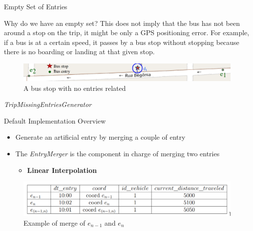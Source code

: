 \documentclass[xcolor=dvipsnames,table]{beamer}
\begin{document}
\begin{frame}{Empty Set of Entries}
        \begin{block}{Why do we have an empty set?}
                This does not imply that the bus has not been around a stop on the trip, 
                it might be only a GPS positioning error. For example, if a bus is at a
                certain speed, it passes by a bus stop without stopping because there
                is no boarding or landing at that given stop.
        \end{block}
        \begin{figure}[h]
                \centering
                \caption{A bus stop with no entries related}
                \includegraphics[width=\textwidth]{images/9202_empty_set.png}
        \end{figure}
\end{frame}
\begin{frame}{\textit{TripMissingEntriesGenerator}}
        \begin{block}{Default Implementation Overview}
                \begin{itemize}
                        \item Generate an artificial entry by merging a couple of entry
                        \item The \textit{EntryMerger} is the component
                                in charge of merging two entries
                                \begin{itemize}
                                        \item \textbf{Linear Interpolation}
                                \end{itemize}
                \end{itemize}
        \end{block}
        \begin{figure}[h]
                \centering
                \includegraphics[width=\textwidth]{images/mergeExemple.png}
                \caption{Example of merge of $e_{n-1}$ and $e_n$}
        \end{figure}
\end{frame}
\end{document}

